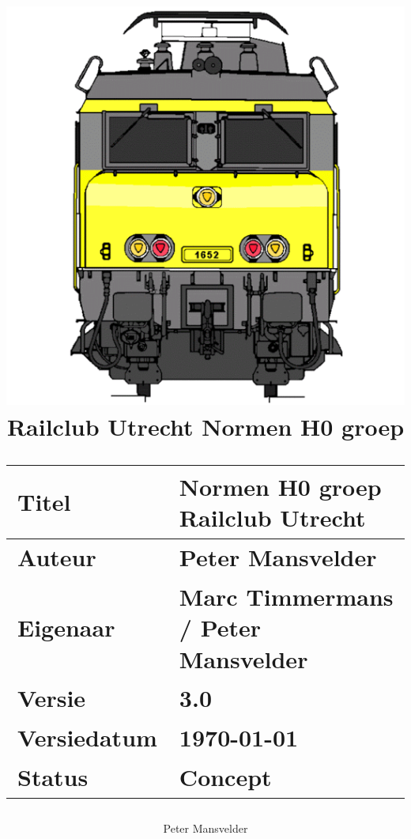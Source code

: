 \documentclass[12pt,a4paper]{report}
\newcommand*{\myfont}{\fontfamily{lmss}\normalsize\selectfont}
\begin{document}
\myfont

\title{
\includegraphics[scale=0.6]{images/RCU_logo}
\makebox[\linewidth]{\rule{\textwidth}{0.4pt}}
Railclub Utrecht
\vfill
Normen H0 groep\\
\makebox[\linewidth]{\rule{\textwidth}{0.4pt}}
\vfill
\small
\author{Peter Mansvelder}
\begin{tabular}{| l | l |}
\hline
\cellcolor[gray]{0.84}Titel & Normen H0 groep Railclub Utrecht\\
\hline
\cellcolor[gray]{0.84}Auteur & Peter Mansvelder\\
\hline
\cellcolor[gray]{0.84}Eigenaar & Marc Timmermans / Peter Mansvelder\\
\hline
\cellcolor[gray]{0.84}Versie & 3.0\\
\hline
\cellcolor[gray]{0.84}Versiedatum & \today\\
\hline
\cellcolor[gray]{0.84}Status & Concept\\
\hline
\end{tabular}
}

\maketitle

\tableofcontents

\listoffigures
\end{document}
